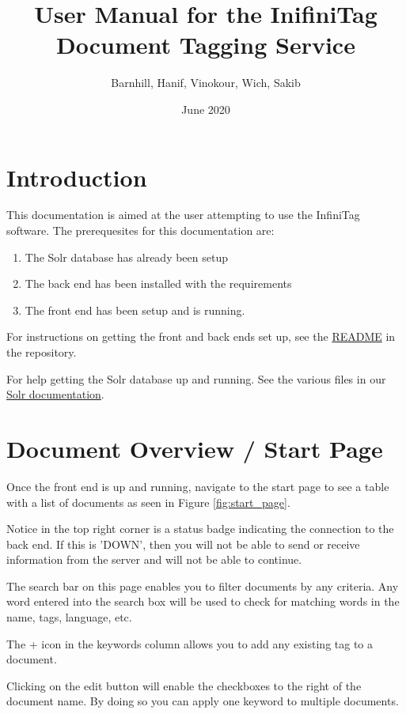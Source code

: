 \documentclass{article}
\title{User Manual for the InifiniTag Document Tagging Service}
\author{Barnhill, Hanif, Vinokour, Wich, Sakib}
\date{June 2020}
\begin{document}
\maketitle
\tableofcontents

\newpage

\section{Introduction}
This documentation is aimed at the user attempting to use the InfiniTag software. The prerequesites
for this documentation are:

\begin{enumerate}
    \item The Solr database has already been setup
    \item The back end has been installed with the requirements
    \item The front end has been setup and is running.
\end{enumerate}

\bigskip
\noindent
For instructions on getting the front and back ends set up, see the \href{https://github.com/AMOS-5/infinitag/blob/master/README.md}{README} in the repository.

\bigskip
\noindent
For help getting the Solr database up and running. See the various files in our \href{https://github.com/AMOS-5/infinitag/tree/master/docs/solr}{Solr documentation}.



\section{Document Overview / Start Page}
\label{docoverview}
Once the front end is up and running, navigate to the start page to see a table with a list of documents as seen in Figure \ref{fig:start_page}.

Notice in the top right corner is a status badge indicating the connection to the back end. If this is 'DOWN', then you will not be able to send or receive information from the server and will not be able to continue.

The search bar on this page enables you to filter documents by any criteria. Any word entered into the search box will be used to check for matching words in the name, tags, language, etc.

The + icon in the keywords column allows you to add any existing tag to a document.

Clicking on the edit button will enable the checkboxes to the right of the document name. By doing so you can apply one keyword to multiple documents.
\end{document}
